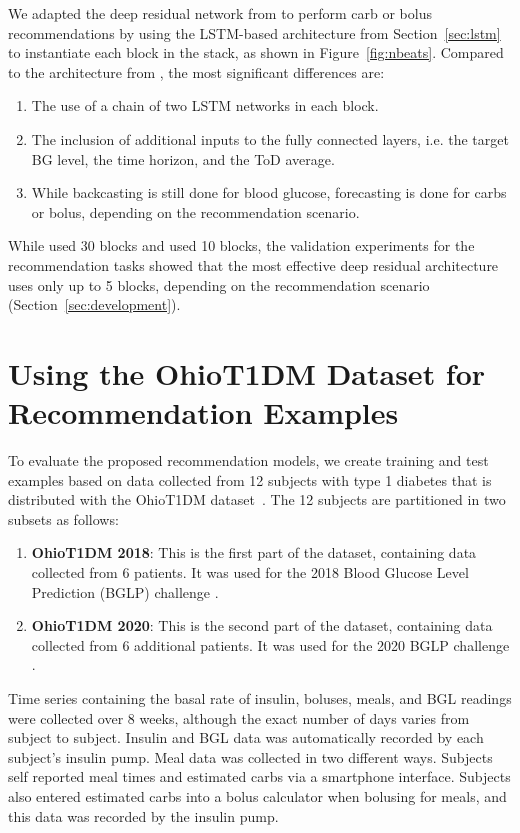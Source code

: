 \documentclass[journal,article,submit,moreauthors,pdftex]{Definitions/mdpi}
\begin{document}
We adapted the deep residual network from \cite{rubin_falcone:nbeats_bgl} to perform carb or bolus recommendations by using the LSTM-based architecture from Section~\ref{sec:lstm} to instantiate each block in the stack, as shown in Figure~\ref{fig:nbeats}. Compared to the architecture from \cite{rubin_falcone:nbeats_bgl}, the most significant differences are:
\begin{enumerate}
    \item The use of a chain of two LSTM networks in each block.
    \item The inclusion of additional inputs to the fully connected layers, i.e. the target BG level, the time horizon, and the ToD average.
    \item While backcasting is still done for blood glucose, forecasting is done for carbs or bolus, depending on the recommendation scenario.
\end{enumerate}
While \citet{oreshkin:nbeats} used 30 blocks and \citet{rubin_falcone:nbeats_bgl} used 10 blocks, the validation experiments for the recommendation tasks showed that the most effective deep residual architecture uses only up to 5 blocks, depending on the recommendation scenario (Section~\ref{sec:development}).


\section{Using the OhioT1DM Dataset for Recommendation Examples}
\label{sec:dataset}

To evaluate the proposed recommendation models, we create training and test examples based on data collected from 12 subjects with type 1 diabetes that is distributed with the OhioT1DM dataset~\cite{ohiot1dm:marling:kdh20}. The 12 subjects are partitioned in two subsets as follows:
\begin{enumerate}
    \item {\bf OhioT1DM 2018}: This is the first part of the dataset, containing data collected from 6 patients. It was used for the 2018 Blood Glucose Level Prediction (BGLP) challenge \cite{kdh-2018-proceedings}.
    \item {\bf OhioT1DM 2020}: This is the second part of the dataset, containing data collected from 6 additional patients. It was used for the 2020 BGLP challenge \cite{kdh-2020-proceedings}.
\end{enumerate}
Time series containing the basal rate of insulin, boluses, meals, and BGL readings were collected over 8 weeks, although the exact number of days varies from subject to subject. 
Insulin and BGL data was automatically recorded by each subject's insulin pump.  Meal data was collected in two different ways.  Subjects self reported meal times and estimated carbs via a smartphone interface.  Subjects also entered estimated carbs into a bolus calculator when bolusing for meals, and this data was recorded by the insulin pump.
\end{document}
